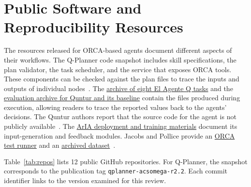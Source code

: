 \documentclass[a4paper,11pt]{article}
\begin{document}
\clearpage
\appendix
\setcounter{table}{0}
\renewcommand{\thetable}{\Alph{section}.\arabic{table}}
\renewcommand{\theHtable}{appendix.\Alph{section}.\arabic{table}}
\section{Public Software and Reproducibility Resources}
\label{app:repos}
The resources released for ORCA-based agents document different aspects of
their workflows.
The Q-Planner code snapshot includes skill specifications, the plan validator,
the task scheduler, and the service that exposes ORCA tools.
These components can be checked against the plan files to trace the inputs
and outputs of individual nodes~\cite{qplanner}.
The \href{https://doi.org/10.5683/SP3/JU2BQK}
  {archive of eight El Agente Q tasks}
and the \href{https://doi.org/10.5683/SP3/RDSOEA}
  {evaluation archive for Quntur and its baseline}
contain the files produced during execution, allowing readers to trace the
reported values back to the agents' decisions.
The Quntur authors report that the source code for the agent is not publicly
available~\cite{agente,quntur}.
The \href{https://doi.org/10.34894/RNPTDS}
  {ArIA deployment and training materials}
document its input-generation and feedback modules.
Jacobs and Pollice provide an
\href{https://git.lwp.rug.nl/pollice-research-group/ORCAInputFileSynthesis/-/blob/f60237db580d44849f30179deed090317a4a768a/Classes/Helpers/ORCARunner.py}
  {ORCA test runner}
and an \href{https://doi.org/10.34894/WNRHA4}{archived dataset}~\cite{aria,input}.

Table~\ref{tab:repos} lists 12 public GitHub repositories.
For Q-Planner, the snapshot corresponds to the publication tag
\texttt{qplanner-acsomega-r2.2}.
Each commit identifier links to the version examined for this review.
\end{document}
